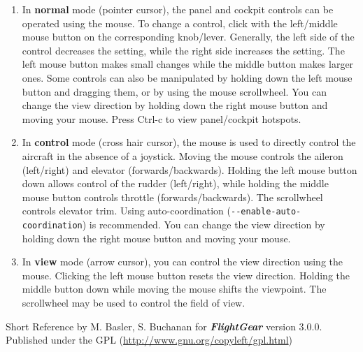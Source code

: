 \documentclass[10pt]{article}
\newcommand{\FlightGear}{{\itshape\bfseries FlightGear}}
\newcommand{\web}[1]{\href{#1}{#1}}
\begin{document}
 \begin{enumerate}
 \item In \textbf{normal} mode (pointer cursor), the panel and cockpit controls can be
 operated using the mouse. To change a control, click with the left/middle mouse button
 on the corresponding knob/lever. Generally, the left side of the control decreases the setting,
 while the right side increases the setting. The left mouse button makes small changes while the
 middle button makes larger ones. Some controls can also be manipulated by holding down the left
 mouse button and dragging them, or by using the mouse scrollwheel. You can change the view
 direction by holding down the right mouse button and moving your mouse.
 Press Ctrl-c to view panel/cockpit hotspots.

 \item In \textbf{control} mode (cross hair cursor), the mouse is used to directly control
 the aircraft in the absence of a joystick. Moving the mouse controls the aileron (left/right)
 and elevator (forwards/backwards). Holding the left mouse button down allows control of the rudder
 (left/right), while holding the middle mouse button controls throttle (forwards/backwards).
 The scrollwheel controls elevator trim. Using auto-coordination
 (\texttt{-$ $-enable-auto-coordination}) is recommended. You can change the view
 direction by holding down the right mouse button and moving your mouse.

 \item In \textbf{view} mode (arrow cursor), you can control the view direction using the mouse.
 Clicking the left mouse button resets the view direction. Holding the middle button down while
 moving the mouse shifts the viewpoint. The scrollwheel may be used to control the field of view.

\end{enumerate}

 \noindent
 Short Reference by M. Basler, S. Buchanan for \FlightGear{} version 3.0.0.\\
 Published under the GPL (\web{http://www.gnu.org/copyleft/gpl.html})
\end{document}

